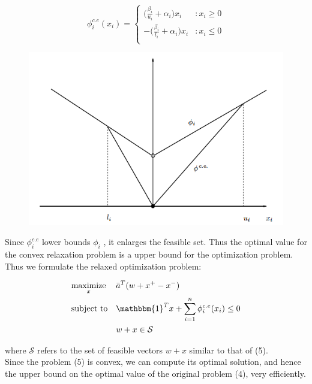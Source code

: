 \documentclass[a4paper]{article}
\begin{document}
\[
 \phi_i^{c.e}(x_i) =
  \begin{cases}
   \big(\frac{\beta_i}{u_i} + \alpha_i \big) x_i & :  x_i \geq  0 \\
    - \big(\frac{\beta_i}{l_i} + \alpha_i \big) x_i & :  x_i \leq 0 \\
  \end{cases}
\]
\begin{figure}[h]
\centering
\includegraphics{convex.png}

\end{figure}

Since $\phi_i^{c.e}$ lower bounds $\phi_i$ , it enlarges the feasible set. Thus the optimal value for the convex relaxation problem is a upper  bound for the optimization problem. Thus we formulate the relaxed optimization problem:

\begin{equation}
\begin{aligned}
& \underset{x}{\text{maximize}}
& & \bar{a}^T (w+x^+ - x^-) \\
& \text{subject to}
& & \mathbbm{1}^Tx + \displaystyle \sum_{i=1}^n \phi_i^{c.e}(x_i) \leq 0  \\
& & & w+x \in \mathcal{S}\\
\end{aligned}
\end{equation}

where $\mathcal{S}$ refers to the set of feasible vectors $w+x$ similar to that of (5).\\

Since the problem (5) is convex, we can compute its optimal solution, and hence the upper
bound on the optimal value of the original problem (4), very efficiently.\\
\end{document}

